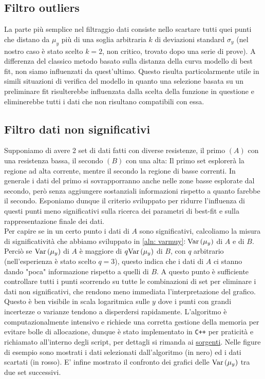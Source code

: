 \documentclass{article}[a4paper, oneside, 11pt]
\begin{document}
\subsection{Filtro outliers}
La parte più semplice nel filtraggio dati consiste nello scartare tutti quei
punti che distano da $\mu_y$ più di una soglia arbitraria $k$ di deviazioni
standard $\sigma_y$ (nel nostro caso è stato scelto $k = 2$, non critico,
trovato dopo una serie di prove). A differenza del classico metodo basato
sulla distanza della curva modello di best fit, non siamo influenzati da
quest’ultimo. Questo risulta particolarmente utile in simili situazioni di
verifica del modello in quanto una selezione basata su un preliminare fit
risulterebbe influenzata dalla scelta della funzione in questione e
eliminerebbe tutti i dati che non risultano compatibili con essa.

\subsection{Filtro dati non significativi}
Supponiamo di avere 2 set di dati fatti con diverse resistenze, il primo $(A)$
con una resistenza bassa, il secondo $(B)$ con una alta: Il primo set esplorerà
la regione ad alta corrente, mentre il secondo la regione di basse correnti.
In generale i dati del primo si sovrapporranno anche nelle zone basse esplorate
dal secondo, però senza aggiungere sostanziali informazioni rispetto a quanto
farebbe il secondo.
Esponiamo dunque il criterio sviluppato per ridurre l'influenza di questi
punti meno significativi sulla ricerca dei parametri di best-fit e sulla
rappresentazione finale dei dati.\\
Per capire se in un certo punto i dati di $A$ sono significativi, calcoliamo
la misura di significatività che abbiamo sviluppato in \eqref{aln: varmuy}$:
\text{Var}\left(\mu_y\right)$ di $A$ e di $B$. Perciò se $\text{Var}\left(\mu_y\right)$ di $A$ è maggiore di 
$q\text{Var}\left(\mu_y\right)$ di $B$, con $q$ arbitrario (nell’esperienza è stato scelto
$q = 3$), questo indica che i dati di $A$
ci stanno dando "poca" informazione rispetto a quelli di $B$. A questo punto
è sufficiente controllare tutti i punti scorrendo su tutte le combinazioni
di set per eliminare i dati non significativi, che rendono meno
immediata l'interpretazione del grafico. Questo è ben visibile in scala
logaritmica sulle $y$ dove i punti con grandi incertezze o varianze tendono
a disperdersi rapidamente.
L’algoritmo è computazionalmente intensivo e richiede una corretta gestione
della memoria per evitare bolle di allocazione, dunque è stato implementato
in \verb'C++' per praticità e richiamato all’interno degli script, per dettagli si 
rimanda ai 
\href{https://github.com/LucaCiucci/relaz_seme/tree/master/Cartella_fit/filter_src}{sorgenti}.
Nelle figure di esempio sono mostrati i dati selezionati dall’algoritmo
(in nero) ed i dati scartati (in rosso). 
E’ infine mostrato il confronto dei grafici delle $\text{Var}\left(\mu_y\right)$
tra due set successivi.
\end{document}
